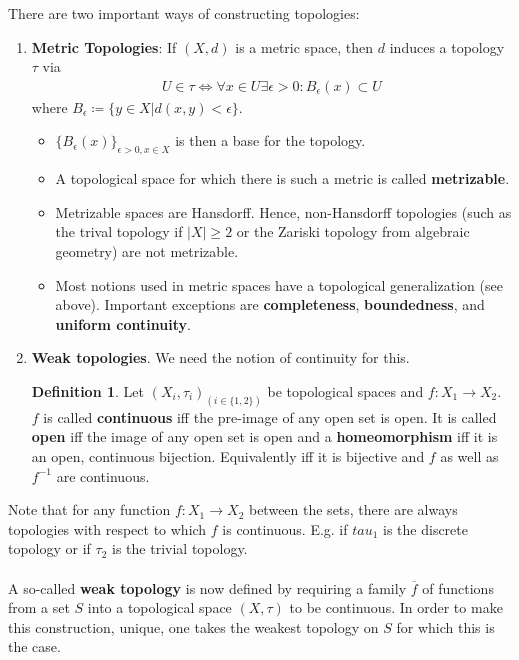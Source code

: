 \documentclass[10pt,a4paper]{article}
\theoremstyle{definition}
\newtheorem{definition}{Definition}
\theoremstyle{cor}
\theoremstyle{theorem}
\theoremstyle{lemma}
\theoremstyle{example}
\begin{document}
\noindent There are two important ways of constructing topologies:
\begin{enumerate}
\item \textbf{Metric Topologies}: If $(X, d)$ is a metric space, then $d$ induces a topology $\tau$ via 
\begin{align*}
U\in \tau \Leftrightarrow \forall x \in U \exists \epsilon > 0 : B_{\epsilon}(x) \subset U
\end{align*}
where $B_{\epsilon} \coloneqq \{y\in X | d(x, y) < \epsilon\}$.
\begin{itemize}
\item $\{B_{\epsilon}(x)\}_{\epsilon > 0, x \in X}$ is then a base for the topology.
\item A topological space for which there is such a metric is called \textbf{metrizable}.
\item Metrizable spaces are Hansdorff. Hence, non-Hansdorff topologies (such as the trival topology if $|X| \geq 2$ or the Zariski topology from algebraic geometry) are not metrizable. 
\item Most notions used in metric  spaces have a topological generalization (see above). Important exceptions are \textbf{completeness}, \textbf{boundedness}, and \textbf{uniform continuity}.
\end{itemize}
\item \textbf{Weak topologies}. We need the notion of continuity for this.
\begin{definition}
Let $(X_i, \tau_i)_{(i \in \{1, 2\})}$ be topological spaces and $f : X_1 \rightarrow X_2$. $f$ is called \textbf{continuous} iff the pre-image of any open set is open. It is called \textbf{open} iff the image of any open set is open and a \textbf{homeomorphism} iff it is an open, continuous bijection. Equivalently iff it is bijective and $f$ as well as $f^{-1}$ are continuous.
\end{definition}
\end{enumerate}
Note that for any function $f:X_1 \rightarrow X_2$ between the sets, there are always topologies with respect to which $f$ is continuous. E.g. if $tau_1$ is the discrete topology or if $\tau_2$ is the trivial topology.
\\ \\
A so-called \textbf{weak topology} is now defined by requiring a family $\overline{f}$ of functions from a set $S$ into a topological space $(X, \tau)$ to be continuous. In order to make this construction, unique, one takes the weakest topology on $S$ for which this is the case.
\end{document}
